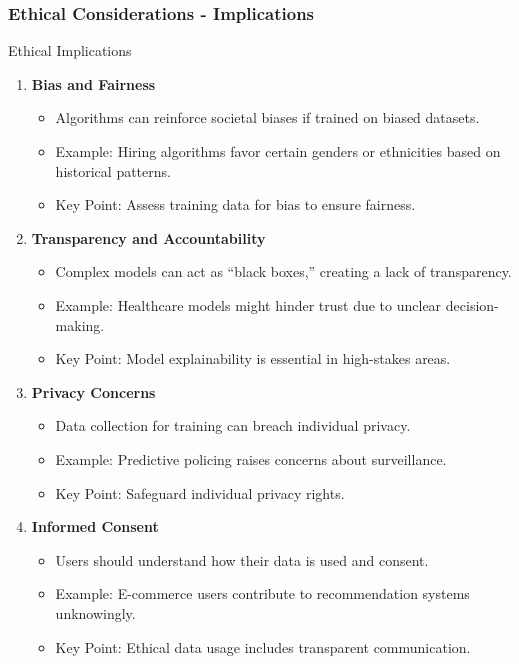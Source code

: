 \documentclass[aspectratio=169]{beamer}
\begin{document}
\begin{frame}[fragile]
    \frametitle{Ethical Considerations - Implications}
    \begin{block}{Ethical Implications}
        \begin{enumerate}
            \item \textbf{Bias and Fairness}
                \begin{itemize}
                    \item Algorithms can reinforce societal biases if trained on biased datasets.
                    \item Example: Hiring algorithms favor certain genders or ethnicities based on historical patterns.
                    \item Key Point: Assess training data for bias to ensure fairness.
                \end{itemize}
            \item \textbf{Transparency and Accountability}
                \begin{itemize}
                    \item Complex models can act as “black boxes,” creating a lack of transparency.
                    \item Example: Healthcare models might hinder trust due to unclear decision-making.
                    \item Key Point: Model explainability is essential in high-stakes areas.
                \end{itemize}
            \item \textbf{Privacy Concerns}
                \begin{itemize}
                    \item Data collection for training can breach individual privacy.
                    \item Example: Predictive policing raises concerns about surveillance.
                    \item Key Point: Safeguard individual privacy rights.
                \end{itemize}
            \item \textbf{Informed Consent}
                \begin{itemize}
                    \item Users should understand how their data is used and consent.
                    \item Example: E-commerce users contribute to recommendation systems unknowingly.
                    \item Key Point: Ethical data usage includes transparent communication.
                \end{itemize}
        \end{enumerate}
    \end{block}
\end{frame}
\end{document}
